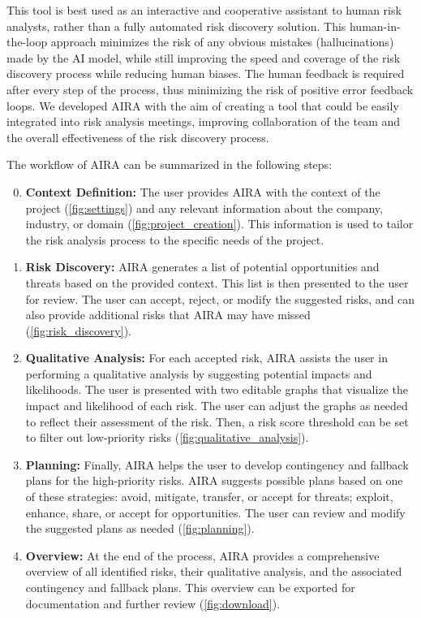 This tool is best used as an interactive and cooperative
assistant to human risk analysts, rather than a fully
automated risk discovery solution.
This human-in-the-loop approach minimizes the risk of 
any obvious mistakes (hallucinations) made by the AI model,
while still improving the speed and coverage
of the risk discovery process while reducing human biases.
The human feedback is required after every step of the
process, thus minimizing the risk of positive error 
feedback loops.
We developed AIRA with the aim of creating a tool that
could be easily integrated into risk analysis meetings,
improving collaboration of the team and the overall
effectiveness of the risk discovery process.

The workflow of AIRA can be summarized in the following steps:
\begin{enumerate}
    \setcounter{enumi}{-1}
    \item \textbf{Context Definition:} The user provides
    AIRA with the context of the project (\autoref{fig:settings}) and any relevant
    information about the company, industry, or domain (\autoref{fig:project_creation}).
    This information is used to tailor the risk analysis
    process to the specific needs of the project.
    \item \textbf{Risk Discovery:} AIRA generates a list
    of potential opportunities and threats based on the
    provided context. This list is then presented to the
    user for review. The user can accept, reject, or modify
    the suggested risks, and can also provide additional
    risks that AIRA may have missed (\autoref{fig:risk_discovery}).
    \item \textbf{Qualitative Analysis:} For each accepted
    risk, AIRA assists the user in performing a qualitative
    analysis by suggesting potential impacts and likelihoods.
    The user is presented with two editable graphs that
    visualize the impact and likelihood of each risk.
    The user can adjust the graphs as needed to reflect
    their assessment of the risk. Then, a risk score
    threshold can be set to filter out low-priority risks (\autoref{fig:qualitative_analysis}).
    \item \textbf{Planning:} Finally, AIRA helps the user
    to develop contingency and fallback plans for the
    high-priority risks. AIRA suggests possible plans
    based on one of these strategies: avoid, mitigate,
    transfer, or accept for threats; exploit, enhance,
    share, or accept for opportunities. The user can
    review and modify the suggested plans as needed (\autoref{fig:planning}).
    \item \textbf{Overview:} At the end of the process,
    AIRA provides a comprehensive overview of all identified
    risks, their qualitative analysis, and the associated
    contingency and fallback plans. This overview can be
    exported for documentation and further review (\autoref{fig:download}).
\end{enumerate}

